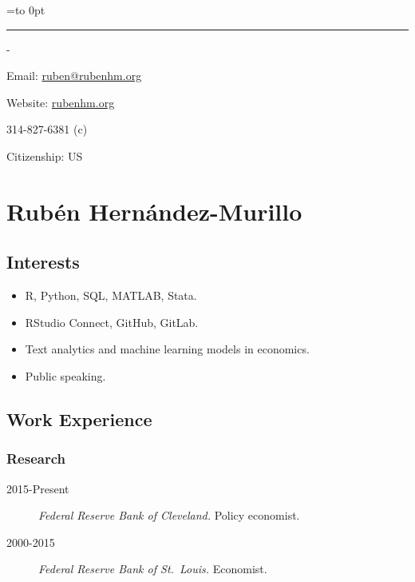 \documentclass[10pt,]{article}
\newenvironment{nospace}
  {\par\edef\theprevdepth{\the\prevdepth}\nointerlineskip
   \setbox\zerobox=\vtop to 0pt\bgroup
   \hrule height0pt\kern\dimexpr\baselineskip-\topskip\relax
  }
  {\par\vss\egroup\ht\zerobox=0pt \wd\zerobox=0pt \dp\zerobox=0pt
   \box\zerobox}
\def\tightlist{}
\begin{document}
\begin{nospace}\begin{flushright}
Email: \href{mailto:ruben@rubenhm.org}{ruben@rubenhm.org}

Website: \href{http://www.rubenhm.org}{rubenhm.org}

314-827-6381 (c)

Citizenship: US


\end{flushright}\end{nospace}

\hypertarget{rubuxe9n-hernuxe1ndez-murillo}{%
\section{Rubén Hernández-Murillo}\label{rubuxe9n-hernuxe1ndez-murillo}}

\hypertarget{interests}{%
\subsection{Interests}\label{interests}}

\begin{itemize}
\tightlist
\item
  R, Python, SQL, MATLAB, Stata.
\item
  RStudio Connect, GitHub, GitLab.
\item
  Text analytics and machine learning models in economics.
\item
  Public speaking.
\end{itemize}

\hypertarget{work-experience}{%
\subsection{Work Experience}\label{work-experience}}

\hypertarget{research}{%
\subsubsection{Research}\label{research}}

\begin{description}
\tightlist
\item[2015-Present]
\emph{Federal Reserve Bank of Cleveland.} Policy economist.
\item[2000-2015]
\emph{Federal Reserve Bank of St.~Louis.} Economist.
\end{description}
\end{document}
